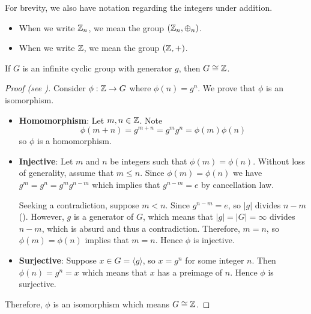 For brevity, we also have notation regarding the integers under addition.
\begin{itemize}
    \item When we write $\mathbb{Z}_n$, we mean the group $(\mathbb{Z}_n, \oplus_n)$.
    \item When we write $\mathbb{Z}$, we mean the group $(\mathbb{Z}, +)$.
\end{itemize}

\begin{theorem}
    If $G$ is an infinite cyclic group with generator $g$, then $G \cong \mathbb{Z}$.
\end{theorem}
\begin{proof}[Proof (see \cite{proofwiki_infinite-cyclic-group})]
    Consider $\phi: \mathbb{Z} \to G$ where $\phi(n) = g^n$. We prove that $\phi$ is an isomorphism.
    \begin{itemize}
        \item \textbf{Homomorphism}: Let $m, n \in \mathbb{Z}$. Note
        \[
            \phi(m+n) = g^{m+n} = g^mg^n = \phi(m)\phi(n)
        \]
        so $\phi$ is a homomorphism.

        \item \textbf{Injective}: Let $m$ and $n$ be integers such that $\phi(m) = \phi(n)$. Without loss of generality, assume that $m \leq n$. Since $\phi(m) = \phi(n)$ we have $g^m = g^n = g^mg^{n-m}$ which implies that $g^{n-m} = e$ by cancellation law.

        Seeking a contradiction, suppose $m < n$. Since $g^{n-m} = e$, so $|g|$ divides $n-m$ (). However, $g$ is a generator of $G$, which means that $|g| = |G| = \infty$ divides $n-m$, which is absurd and thus a contradiction. Therefore, $m = n$, so $\phi(m) = \phi(n)$ implies that $m = n$. Hence $\phi$ is injective.

        \item \textbf{Surjective}: Suppose $x \in G = \langle g\rangle$, so $x = g^n$ for some integer $n$. Then $\phi(n) = g^n = x$ which means that $x$ has a preimage of $n$. Hence $\phi$ is surjective.
    \end{itemize}

    Therefore, $\phi$ is an isomorphism which means $G \cong \mathbb{Z}$.
\end{proof}

